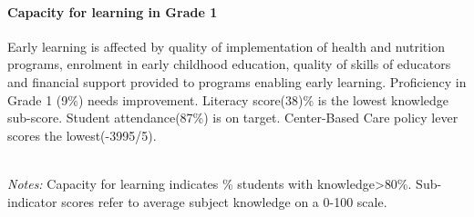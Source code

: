 \documentclass[twocolumn]{article}
\let\oldparagraph\paragraph
\renewcommand{\paragraph}[1]{\oldparagraph{#1}\mbox{}}
\begin{document}
\hypertarget{capacity-for-learning-in-grade-1}{%
\paragraph{\texorpdfstring{\textbf{Capacity for learning in Grade
1}}{Capacity for learning in Grade 1}}\label{capacity-for-learning-in-grade-1}}

Early learning is affected by quality of implementation of health and
nutrition programs, enrolment in early childhood education, quality of
skills of educators and financial support provided to programs enabling
early learning. Proficiency in Grade 1 (9\%) needs improvement. Literacy
score(38)\% is the lowest knowledge sub-score. Student attendance(87\%)
is on target. Center-Based Care policy lever scores the lowest(-3995/5).
\vfill\null

\begin{table}[H]
\\
\color{darkgray}\scriptsize{\textit{Notes:} Capacity for learning indicates \% students with knowledge\textgreater{80\%}. Sub-indicator scores refer to average subject knowledge on a 0-100 scale.}
\end{table}
\raggedbottom
\end{document}
